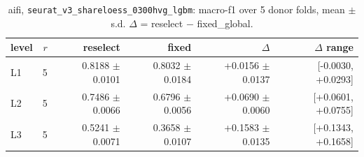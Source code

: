 \begin{table}[t]
\centering
\small
\begin{tabular}{lrrrrr}
\toprule
level & $r$ & reselect & fixed & $\Delta$ & $\Delta$ range \\
\midrule
L1 & 5 & 0.8188 $\pm$ 0.0101 & 0.8032 $\pm$ 0.0184 & +0.0156 $\pm$ 0.0137 & [-0.0030, +0.0293] \\
L2 & 5 & 0.7486 $\pm$ 0.0066 & 0.6796 $\pm$ 0.0056 & +0.0690 $\pm$ 0.0060 & [+0.0601, +0.0755] \\
L3 & 5 & 0.5241 $\pm$ 0.0071 & 0.3658 $\pm$ 0.0107 & +0.1583 $\pm$ 0.0135 & [+0.1343, +0.1658] \\
\bottomrule
\end{tabular}
\caption{aifi, \texttt{seurat\_v3\_shareloess\_0300hvg\_lgbm}: macro-f1 over 5 donor folds, mean $\pm$ s.d. $\Delta$ = reselect $-$ fixed\_global.}
\label{tab:cv-aifi-seurat-v3-shareloess-0300hvg-lgbm-macro_f1}
\end{table}
